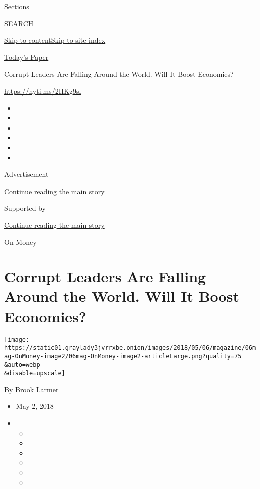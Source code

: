 Sections

SEARCH

\protect\hyperlink{site-content}{Skip to
content}\protect\hyperlink{site-index}{Skip to site index}

\href{https://myaccount.nytimes3xbfgragh.onion/auth/login?response_type=cookie\&client_id=vi}{}

\href{https://www.nytimes3xbfgragh.onion/section/todayspaper}{Today's
Paper}

Corrupt Leaders Are Falling Around the World. Will It Boost Economies?

\url{https://nyti.ms/2HKg9sl}

\begin{itemize}
\item
\item
\item
\item
\item
\item
\end{itemize}

Advertisement

\protect\hyperlink{after-top}{Continue reading the main story}

Supported by

\protect\hyperlink{after-sponsor}{Continue reading the main story}

\href{/column/on-money}{On Money}

\hypertarget{corrupt-leaders-are-falling-around-the-world-will-it-boost-economies}{%
\section{Corrupt Leaders Are Falling Around the World. Will It Boost
Economies?}\label{corrupt-leaders-are-falling-around-the-world-will-it-boost-economies}}

\texttt{[image: https://static01.graylady3jvrrxbe.onion/images/2018/05/06/magazine/06mag-OnMoney-image2/06mag-OnMoney-image2-articleLarge.png?quality=75\\\&auto=webp\\\&disable=upscale]}

By Brook Larmer

\begin{itemize}
\item
  May 2, 2018
\item
  \begin{itemize}
  \item
  \item
  \item
  \item
  \item
  \item
  \end{itemize}
\end{itemize}

